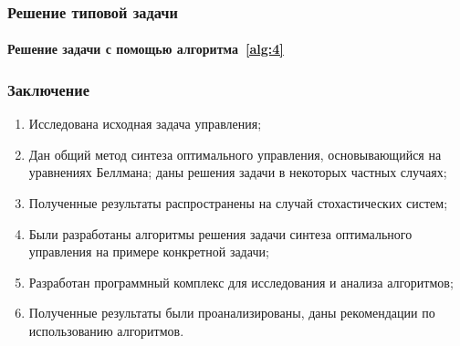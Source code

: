 \documentclass[ignorenonframetext,hyperref={pdftex,unicode},compress]{beamer}
\begin{document}
\begin{frame}
	\frametitle{Решение типовой задачи}
	\framesubtitle{Решение задачи с помощью алгоритма~\ref{alg:4}}
    
    \begin{figure}\center
        
        \label{fig:alg4}
    \end{figure}
\end{frame}



\begin{frame}
	\frametitle{Заключение}
    
    \begin{enumerate}
        \item
            Исследована исходная задача управления;

        \item
            Дан общий метод синтеза оптимального управления, основывающийся на уравнениях Беллмана; даны решения задачи в некоторых частных случаях;

        \item
            Полученные результаты распространены на случай стохастических систем;

        \item
            Были разработаны алгоритмы решения задачи синтеза оптимального управления на примере конкретной задачи;

        \item
            Разработан программный комплекс для исследования и анализа алгоритмов;

        \item
            Полученные результаты были проанализированы, даны рекомендации по использованию алгоритмов.
    \end{enumerate}
\end{frame}
\end{document}
